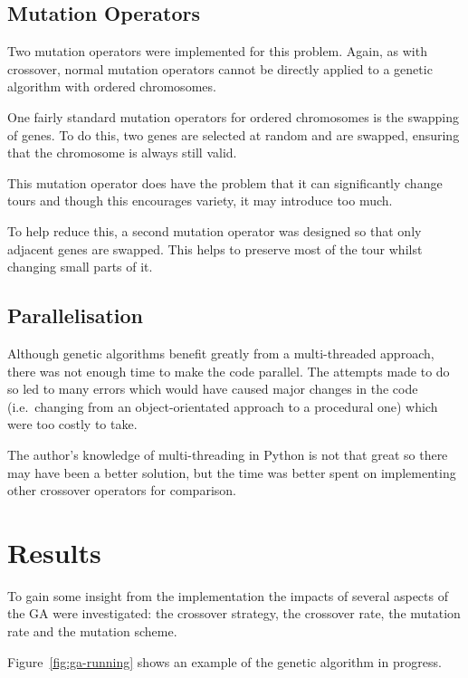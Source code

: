 \documentclass[10pt, a4paper]{article}
\begin{document}
\subsection{Mutation Operators}

Two mutation operators were implemented for this problem. Again, as with
crossover, normal mutation operators cannot be directly applied to a genetic
algorithm with ordered chromosomes.

One fairly standard mutation operators for ordered chromosomes is the swapping
of genes. To do this, two genes are selected at random and are swapped, ensuring
that the chromosome is always still valid.

This mutation operator does have the problem that it can significantly change
tours and though this encourages variety, it may introduce too much.

To help reduce this, a second mutation operator was designed so that only
adjacent genes are swapped. This helps to preserve most of the tour whilst
changing small parts of it.


\subsection{Parallelisation}

Although genetic algorithms benefit greatly from a multi-threaded approach,
there was not enough time to make the code parallel. The attempts made to do so
led to many errors which would have caused major changes in the code (i.e.\
changing from an object-orientated approach to a procedural one) which were too
costly to take.

The author's knowledge of multi-threading in Python is not that great so there
may have been a better solution, but the time was better spent on implementing
other crossover operators for comparison.


 
\newpage
\section{Results}
\label{sec:results}

To gain some insight from the implementation the impacts of several aspects of
the GA were investigated: the crossover strategy, the crossover rate, the
mutation rate and the mutation scheme.

Figure~\ref{fig:ga-running} shows an example of the genetic algorithm in
progress.
\end{document}
